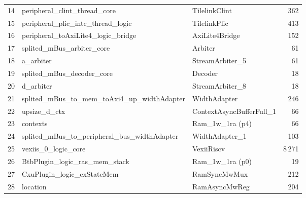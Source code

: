\begin{table}[!htbp]
\begin{tabular}{rllr}
14 & \quad\quad peripheral\_clint\_thread\_core                          & TilelinkClint                                    &    362 \\
15 & \quad\quad peripheral\_plic\_intc\_thread\_logic                    & TilelinkPlic                                     &    413 \\
16 & \quad\quad peripheral\_toAxiLite4\_logic\_bridge                    & AxiLite4Bridge                                   &    152 \\
17 & \quad\quad splited\_mBus\_arbiter\_core                             & Arbiter                                          &     61 \\
18 & \quad\quad\quad a\_arbiter                                          & StreamArbiter\_5                                 &     61 \\
19 & \quad\quad splited\_mBus\_decoder\_core                             & Decoder                                          &     18 \\
20 & \quad\quad\quad d\_arbiter                                          & StreamArbiter\_8                                 &     18 \\
21 & \quad\quad splited\_mBus\_to\_mem\_toAxi4\_up\_widthAdapter         & WidthAdapter                                     &    246 \\
22 & \quad\quad\quad upsize\_d\_ctx                                      & ContextAsyncBufferFull\_1                        &     66 \\
23 & \quad\quad\quad\quad contexts                                       & Ram\_1w\_1ra (p4)                                &     66 \\
24 & \quad\quad splited\_mBus\_to\_peripheral\_bus\_widthAdapter         & WidthAdapter\_1                                  &    103 \\
25 & \quad\quad vexiis\_0\_logic\_core                                   & VexiiRiscv                                       &  8\,271 \\
26 & \quad\quad\quad BtbPlugin\_logic\_ras\_mem\_stack                   & Ram\_1w\_1ra (p0)                                &     19 \\
27 & \quad\quad\quad CxuPlugin\_logic\_cxStateMem                        & RamSyncMwMux                                     &    212 \\
28 & \quad\quad\quad\quad location                                       & RamAsyncMwReg                                    &    204 \\

\end{tabular}
\end{table}
